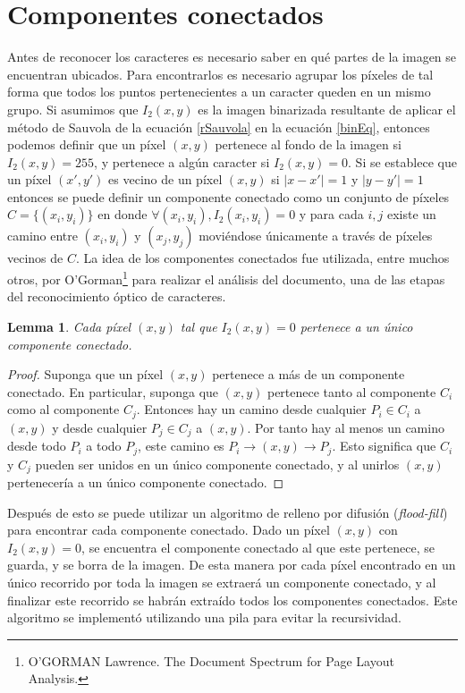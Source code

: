 \documentclass[a4paper, 11pt, oneside]{report}
\begin{document}
\section{Componentes conectados}
\label{sect:conComponents}
Antes de reconocer los caracteres es necesario saber en qué partes de la imagen se encuentran ubicados. Para encontrarlos es necesario agrupar los píxeles de tal forma que todos los puntos pertenecientes a un caracter queden en un mismo grupo. Si asumimos que $I_2(x,y)$ es la imagen binarizada resultante de aplicar el método de Sauvola de la ecuación \eqref{rSauvola} en la ecuación \eqref{binEq}, entonces podemos definir que un píxel $(x,y)$ pertenece al fondo de la imagen si $I_2(x,y)=255$, y pertenece a algún caracter si $I_2(x,y)=0$. Si se establece que un píxel $(x',y')$ es vecino de un píxel $(x,y)$ si $|x-x'|=1$ y $|y-y'|=1$ entonces se puede definir un componente conectado como un conjunto de píxeles $C=\{(x_i,y_i)\}$ en donde $\forall{(x_i,y_i)}, I_2(x_i,y_i)=0$ y para cada $i,j$ existe un camino entre $(x_i,y_i)$ y $(x_j,y_j)$ moviéndose únicamente a través de píxeles vecinos de $C$. La idea de los componentes conectados fue utilizada, entre muchos otros, por O'Gorman\footnote{O’GORMAN Lawrence. The Document Spectrum for Page Layout Analysis.} para realizar el análisis del documento, una de las etapas del reconocimiento óptico de caracteres.
\newtheorem{pixHasOneC}{Lemma}
\begin{pixHasOneC}
Cada píxel $(x,y)$ tal que $I_2(x,y)=0$ pertenece a un único componente conectado.
\end{pixHasOneC}
\begin{proof}
Suponga que un píxel $(x,y)$ pertenece a más de un componente conectado. En particular, suponga que $(x,y)$ pertenece tanto al componente $C_i$ como al componente $C_j$. Entonces hay un camino desde cualquier $P_i \in C_i$ a $(x,y)$ y desde cualquier $P_j \in C_j$ a $(x,y)$. Por tanto hay al menos un camino desde todo $P_i$ a todo $P_j$, este camino es $P_i \rightarrow (x,y) \rightarrow P_j$. Esto significa que $C_i$ y $C_j$ pueden ser unidos en un único componente conectado, y al unirlos $(x,y)$ pertenecería a un único componente conectado.
\end{proof}
Después de esto se puede utilizar un algoritmo de relleno por difusión ({\em flood-fill}) para encontrar cada componente conectado. Dado un píxel $(x,y)$ con $I_2(x,y)=0$, se encuentra el componente conectado al que este pertenece, se guarda, y se borra de la imagen. De esta manera por cada píxel encontrado en un único recorrido por toda la imagen se extraerá un componente conectado, y al finalizar este recorrido se habrán extraído todos los componentes conectados. Este algoritmo se implementó utilizando una pila para evitar la recursividad.
\end{document}
